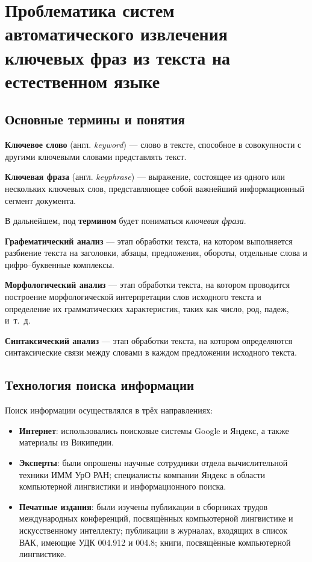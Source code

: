 \chapter{Проблематика систем автоматического извлечения ключевых
фраз из текста на естественном языке}
\label{chap:Agenda}

\section{Основные термины и понятия}
\textbf{Ключевое слово} (англ. \emph{keyword}) —
слово в тексте, способное в совокупности с
другими ключевыми словами представлять текст.

\textbf{Ключевая фраза} (англ. \emph{keyphrase}) —
выражение, состоящее из одного или нескольких ключевых
слов, представляющее собой важнейший информационный
сегмент документа.

В дальнейшем, под \textbf{термином} будет пониматься
\emph{ключевая фраза}.

\textbf{Графематический анализ} — этап обработки текста,
на котором выполняется разбиение текста на заголовки,
абзацы, предложения, обороты, отдельные слова и
цифро--буквенные комплексы.

\textbf{Морфологический анализ} — этап обработки текста,
на котором проводится построение морфологической интерпретации
слов исходного текста и определение их грамматических
характеристик, таких как число, род, падеж, и\ т.\ д.

\textbf{Синтаксический анализ} — этап обработки текста,
на котором определяются синтаксические связи между словами в
каждом предложении исходного текста.

\section{Технология поиска информации}
\label{sec:Searching}
Поиск информации осуществлялся в трёх направлениях:
\begin{itemize}
  \item \textbf{Интернет}: использовались поисковые системы
Google и Яндекс, а также материалы из Википедии.
  \item \textbf{Эксперты}: были опрошены
научные сотрудники отдела вычислительной техники ИММ УрО РАН;
специалисты компании Яндекс в области компьютерной
лингвистики и информационного поиска.
  \item \textbf{Печатные издания}: были изучены
публикации в сборниках трудов международных конференций,
посвящённых компьютерной лингвистике и искусственному
интеллекту;
публикации в журналах, входящих в список ВАК,
имеющие УДК 004.912 и 004.8;
книги, посвящённые компьютерной лингвистике.
\end{itemize}

